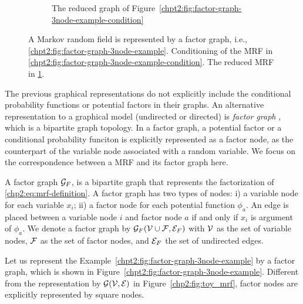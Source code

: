 \begin{figure}[!t]
\begin{subfigure}{.3\textwidth}
    \caption{The reduced graph of Figure~\ref{chpt2:fig:factor-graph-3node-example-condition}}
    \label{chpt2:fig:factor-graph-3node-example-reduced}
  \end{subfigure}
  
  \caption{A Markov random field is represented by a factor graph, i.e., \ref{chpt2:fig:factor-graph-3node-example}. Conditioning of the MRF in \ref{chpt2:fig:factor-graph-3node-example-condition}. The reduced MRF in \ref{chpt2:fig:factor-graph-3node-example-reduced}.}
  \label{chp2:tab:toy-factor-graph}
  \hspace{1cm}
\end{figure}

The previous graphical representations do not explicitly include the conditional probability functions or potential factors in their graphs. An alternative representation to a graphical model (undirected or directed) is \textit{factor graph} \cite{kschischang2001factor_graph},
which is a bipartite graph topology. In a factor graph, a potential factor or a conditional probability funciton is explicitly represented as a factor node, as the counterpart of the variable node associated with a random variable. We focus on the correspondence between a MRF and its factor graph here.
\begin{definition}\label{chpt2:def:factor-graph}
  A factor graph $\mathcal{G}_F$, is a bipartite graph that represents the factorization of \eqref{chp2:eq:mrf-definition}. A factor graph has two types of nodes: i) a variable node for each variable $x_i$; ii) a factor node for each potential function $\phi_{a}$. An edge is placed between a variable node $i$ and factor node $a$ if and only if $x_i$ is argument of $\phi_{a}$. We denote a factor graph by $\mathcal{G}_F(\mathcal{V} \cup \mathcal{F}, \mathcal{E}_F)$ with $\mathcal{V}$ as the set of variable nodes, $\mathcal{F}$ as the set of factor nodes, and $\mathcal{E}_F$ the set of undirected edges.
\end{definition}
\begin{example}
  Let us represent the Example~\ref{chpt2:fig:factor-graph-3node-example} by a factor graph, which is shown in Figure~\ref{chpt2:fig:factor-graph-3node-example}. Different from the representation by $\mathcal{G}(\mathcal{V}, \mathcal{E})$ in Figure~\ref{chp2:fig:toy_mrf}, factor nodes are explicitly represented by square nodes.
\end{example}


